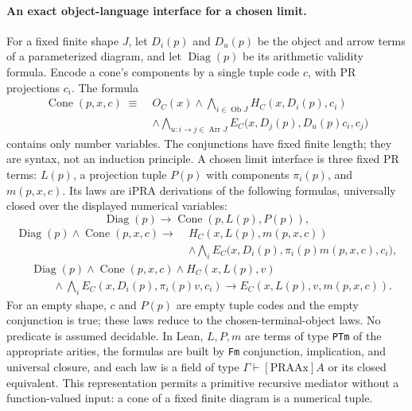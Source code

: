\paragraph{An exact object-language interface for a chosen limit.}
For a fixed finite shape $J$, let $D_i(p)$ and $D_u(p)$ be the object and
arrow terms of a parameterized diagram, and let $\operatorname{Diag}(p)$
be its arithmetic validity formula.  Encode a cone's components by a
single tuple code $c$, with PR projections $c_i$.  The formula
\[
\begin{split}
 \operatorname{Cone}(p,x,c)\;\equiv\;& O_C(x)
 \wedge\bigwedge_{i\in\operatorname{Ob}J}H_C(x,D_i(p),c_i)\\
 &\wedge\bigwedge_{u:i\to j\in\operatorname{Arr}J}
 E_C\bigl(x,D_j(p),D_u(p)c_i,c_j\bigr)
\end{split}
\]
contains only number variables.  The conjunctions have fixed finite length;
they are syntax, not an induction principle.  A chosen limit interface is
three fixed PR terms: $L(p)$, a projection tuple $P(p)$ with components
$\pi_i(p)$, and $m(p,x,c)$.  Its laws are iPRA derivations of the following
formulas, universally closed over the displayed numerical variables:
\[
 \operatorname{Diag}(p)\longrightarrow
 \operatorname{Cone}(p,L(p),P(p)),
\]
\[
\begin{split}
 \operatorname{Diag}(p)\wedge\operatorname{Cone}(p,x,c)
 \longrightarrow\;&H_C(x,L(p),m(p,x,c))\\
 &\wedge\bigwedge_i E_C\bigl(x,D_i(p),
          \pi_i(p)m(p,x,c),c_i\bigr),
\end{split}
\]
\[
\begin{split}
 &\operatorname{Diag}(p)\wedge\operatorname{Cone}(p,x,c)
 \wedge H_C(x,L(p),v)\\
 &\qquad\wedge\bigwedge_i E_C(x,D_i(p),\pi_i(p)v,c_i)
 \longrightarrow E_C(x,L(p),v,m(p,x,c)).
\end{split}
\]
For an empty shape, $c$ and $P(p)$ are empty tuple codes and the empty
conjunction is true; these laws reduce to the chosen-terminal-object laws.
No predicate is assumed decidable.  In Lean, $L,P,m$ are terms of type
\texttt{PTm} of the appropriate arities, the formulas are built by
\texttt{Fm} conjunction, implication, and universal closure, and each law
is a field of type $\Gamma\vdash[\mathrm{PRAAx}]A$ or its closed equivalent.
This representation permits a primitive recursive mediator without a
function-valued input: a cone of a fixed finite diagram is a numerical tuple.
